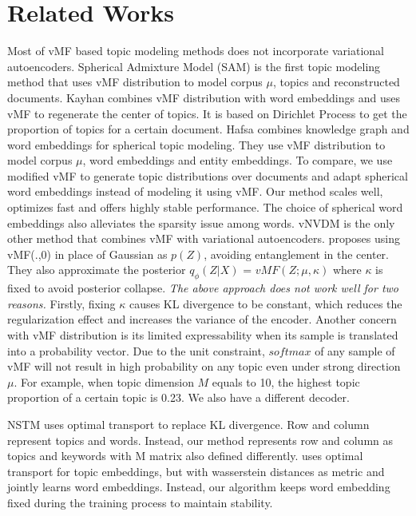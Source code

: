 \documentclass[11pt]{article}
\begin{document}
\section{Related Works}
\label{vMF}
Most of vMF based topic modeling methods does not incorporate variational autoencoders. Spherical Admixture Model (SAM) \cite{reisinger2010spherical} is the first topic modeling method that uses vMF distribution to model corpus $\mu$, topics and reconstructed documents. Kayhan \cite{batmanghelich2016nonparametric} combines vMF distribution with word embeddings and uses vMF to regenerate the center of topics. It is based on Dirichlet Process to get the proportion of topics for a certain document. Hafsa \cite{9547420} combines knowledge graph and word embeddings for spherical topic modeling. They use vMF distribution to model corpus $\mu$, word embeddings and entity embeddings. To compare, we use modified vMF to generate topic distributions over documents and adapt spherical word embeddings instead of modeling it using vMF. Our method scales well, optimizes fast and offers highly stable performance. The choice of spherical word embeddings also alleviates the sparsity issue among words. vNVDM \cite{xu2018spherical} is the only other method that combines vMF with variational autoencoders. \cite{xu2018spherical} proposes using vMF(.,0) in place of Gaussian as $p(Z)$, avoiding entanglement in the center. They also approximate the posterior $q_{\phi}(Z|X)$ = $vMF(Z;\mu,\kappa)$  where $\kappa$ is fixed to avoid posterior collapse. \textit{The above approach does not work well for two reasons.} Firstly, fixing $\kappa$ causes KL divergence to be constant, which reduces the regularization effect and increases the variance of the encoder.  Another concern with vMF distribution is its limited expressability when its sample is translated into a probability vector. Due to the unit constraint, $softmax$ of any sample of vMF will not result in high probability on any topic even under strong direction $\mu$. For example, when topic dimension $M$ equals to 10, the highest topic proportion of a certain topic is 0.23. We also have a different decoder.


NSTM \cite{zhao2020neural} uses optimal transport to replace KL divergence. Row and column represent topics and words. Instead, our method represents row and column as topics and keywords with M matrix also defined differently. \cite{xu2018distilled} uses optimal transport for topic embeddings, but with wasserstein distances as metric and jointly learns word embeddings. Instead, our algorithm keeps word embedding fixed during the training process to maintain stability. 
\end{document}
